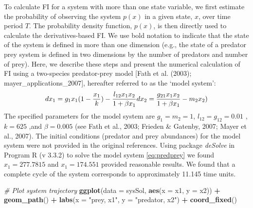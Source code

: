 \documentclass[12pt,twoside,openany]{reedthesis}
\newenvironment{Shaded}{\begin{snugshade}}{\end{snugshade}}
\newcommand{\CommentTok}[1]{\textcolor[rgb]{0.56,0.35,0.01}{\textit{#1}}}
\newcommand{\DataTypeTok}[1]{\textcolor[rgb]{0.13,0.29,0.53}{#1}}
\newcommand{\KeywordTok}[1]{\textcolor[rgb]{0.13,0.29,0.53}{\textbf{#1}}}
\newcommand{\NormalTok}[1]{#1}
\newcommand{\OperatorTok}[1]{\textcolor[rgb]{0.81,0.36,0.00}{\textbf{#1}}}
\newcommand{\StringTok}[1]{\textcolor[rgb]{0.31,0.60,0.02}{#1}}
\begin{document}
To calculate FI for a system with more than one state variable, we first estimate the probability of observing the system \(p(x)\) in a given state, \(x\), over time period \(T\). The probability density function, \(p(x)\), is then directly used to calculate the derivatives-based FI. We use bold notation to indicate that the state of the system is defined in more than one dimension (e.g., the state of a predator prey system is defined in two dimensions by the number of predators and number of prey). Here, we describe these steps and present the numerical calculation of FI using a two-species predator-prey model {[}Fath et al. (2003); mayer\_applications\_2007{]}, hereafter referred to as the `model system':
\begin{equation} 
  dx_1 = g_{1}x_{1}(1-\frac{x_1}{k})- \frac{l_{12} x_{1} x_{2}}{1+\beta x_{1}} \\
  dx_2 = \frac{g_{21}x_1 x_2}{1+\beta x_1} - m_2 x_2)
  \label{eq:predprey}
\end{equation}
The specified parameters for the model system are \(g_1=m_2=1\), \(l_12=g_12 = 0.01\) , \(k=625\) ,and \(\beta=0.005\) (see Fath et al., 2003; Frieden \& Gatenby, 2007; Mayer et al., 2007). The initial conditions (predator and prey abundances) for the model system were not provided in the original references. Using package \emph{deSolve} in Program R (v 3.3.2) to solve the model system \eqref{eq:predprey} we found \(x_1 = 277.7815\) and \(x_1= 174.551\) provided reasonable results. We found that a complete cycle of the system corresponds to approximately 11.145 time units.
\begin{Shaded}
\begin{Highlighting}[]
\CommentTok{# Plot system trajectory}
\KeywordTok{ggplot}\NormalTok{(}\DataTypeTok{data =}\NormalTok{ sysSol, }\KeywordTok{aes}\NormalTok{(}\DataTypeTok{x =}\NormalTok{ x1, }\DataTypeTok{y =}\NormalTok{ x2)) }\OperatorTok{+}
\StringTok{  }\KeywordTok{geom_path}\NormalTok{() }\OperatorTok{+}
\StringTok{  }\KeywordTok{labs}\NormalTok{(}\DataTypeTok{x =} \StringTok{"prey, x1"}\NormalTok{, }\DataTypeTok{y =} \StringTok{"predator, x2"}\NormalTok{) }\OperatorTok{+}
\StringTok{  }\KeywordTok{coord_fixed}\NormalTok{()}
\end{Highlighting}
\end{Shaded}
\end{document}
